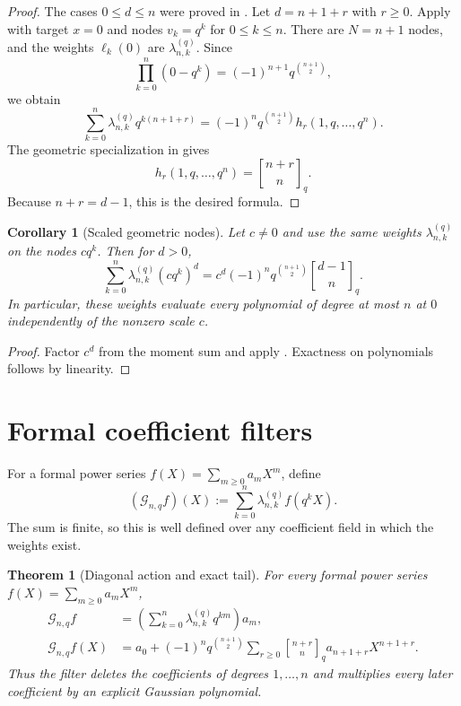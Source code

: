 \documentclass[11pt,oneside,openany]{book}
\newtheorem{theorem}{Theorem}[chapter]
\newtheorem{corollary}[corollary]{Corollary}
\theoremstyle{definition}
\theoremstyle{remark}
\newcommand{\Qbinom}[3]{\genfrac{[}{]}{0pt}{}{#1}{#2}_{#3}}
\begin{document}
\begin{proof}
The cases $0\le d\le n$ were proved in .  Let $d=n+1+r$ with $r\ge0$.  Apply  with target $x=0$ and nodes
$v_k=q^k$ for $0\le k\le n$.  There are $N=n+1$ nodes, and the weights $\ell_k(0)$ are $\lambda_{n,k}^{(q)}$.  Since
\[
 \prod_{k=0}^{n}(0-q^k)=(-1)^{n+1}q^{\binom{n+1}{2}},
\]
we obtain
\[
 \sum_{k=0}^{n}\lambda_{n,k}^{(q)}q^{k(n+1+r)}
 =(-1)^nq^{\binom{n+1}{2}}h_r(1,q,\ldots,q^n).
\]
The geometric specialization in  gives
\[
 h_r(1,q,\ldots,q^n)=\Qbinom{n+r}{n}{q}.
\]
Because $n+r=d-1$, this is the desired formula.
\end{proof}

\begin{corollary}[Scaled geometric nodes]\label{cor:scaled-geometric-moments}
Let $c\ne0$ and use the same weights $\lambda_{n,k}^{(q)}$ on the nodes $cq^k$.  Then for $d>0$,
\[
 \sum_{k=0}^{n}\lambda_{n,k}^{(q)}(cq^k)^d
 =c^d(-1)^nq^{\binom{n+1}{2}}\Qbinom{d-1}{n}{q}.
\]
In particular, these weights evaluate every polynomial of degree at most $n$ at $0$ independently of the nonzero scale $c$.
\end{corollary}

\begin{proof}
Factor $c^d$ from the moment sum and apply .  Exactness on polynomials follows by linearity.
\end{proof}

\section{Formal coefficient filters}

For a formal power series $f(X)=\sum_{m\ge0}a_mX^m$, define
\begin{equation}\label{eq:geometric-filter-definition}
 (\mathcal G_{n,q}f)(X)
 :=\sum_{k=0}^{n}\lambda_{n,k}^{(q)}f(q^kX).
\end{equation}
The sum is finite, so this is well defined over any coefficient field in which the weights exist.

\begin{theorem}[Diagonal action and exact tail]\label{thm:geometric-filter-diagonal}
For every formal power series $f(X)=\sum_{m\ge0}a_mX^m$,
\begin{align}
 [X^m]\mathcal G_{n,q}f
 &=\left(\sum_{k=0}^{n}\lambda_{n,k}^{(q)}q^{km}\right)a_m,
 \label{eq:filter-diagonal}\\
 \mathcal G_{n,q}f(X)
 &=a_0+(-1)^nq^{\binom{n+1}{2}}
   \sum_{r\ge0}\Qbinom{n+r}{n}{q}a_{n+1+r}X^{n+1+r}.
 \label{eq:filter-exact-tail}
\end{align}
Thus the filter deletes the coefficients of degrees $1,\ldots,n$ and multiplies every later coefficient by an explicit Gaussian polynomial.
\end{theorem}
\end{document}
